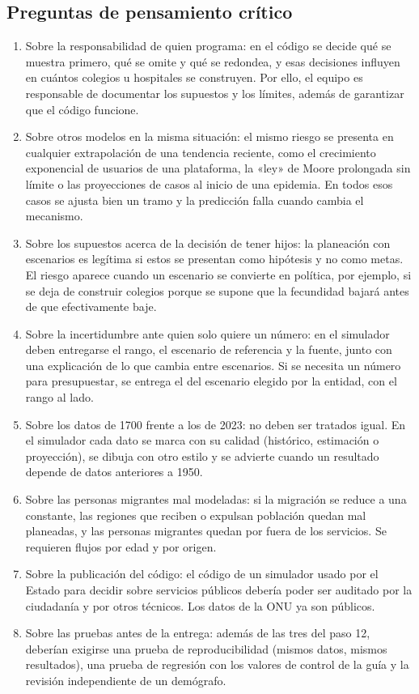 \documentclass[10pt,twocolumn,letterpaper]{article}
\begin{document}
\subsection{Preguntas de pensamiento crítico}
\begin{enumerate}
\item Sobre la responsabilidad de quien programa: en el código se decide qué se muestra primero, qué se omite y qué se redondea, y esas decisiones influyen en cuántos colegios u hospitales se construyen. Por ello, el equipo es responsable de documentar los supuestos y los límites, además de garantizar que el código funcione.
\item Sobre otros modelos en la misma situación: el mismo riesgo se presenta en cualquier extrapolación de una tendencia reciente, como el crecimiento exponencial de usuarios de una plataforma, la «ley» de Moore prolongada sin límite o las proyecciones de casos al inicio de una epidemia. En todos esos casos se ajusta bien un tramo y la predicción falla cuando cambia el mecanismo.
\item Sobre los supuestos acerca de la decisión de tener hijos: la planeación con escenarios es legítima si estos se presentan como hipótesis y no como metas. El riesgo aparece cuando un escenario se convierte en política, por ejemplo, si se deja de construir colegios porque se supone que la fecundidad bajará antes de que efectivamente baje.
\item Sobre la incertidumbre ante quien solo quiere un número: en el simulador deben entregarse el rango, el escenario de referencia y la fuente, junto con una explicación de lo que cambia entre escenarios. Si se necesita un número para presupuestar, se entrega el del escenario elegido por la entidad, con el rango al lado.
\item Sobre los datos de 1700 frente a los de 2023: no deben ser tratados igual. En el simulador cada dato se marca con su calidad (histórico, estimación o proyección), se dibuja con otro estilo y se advierte cuando un resultado depende de datos anteriores a 1950.
\item Sobre las personas migrantes mal modeladas: si la migración se reduce a una constante, las regiones que reciben o expulsan población quedan mal planeadas, y las personas migrantes quedan por fuera de los servicios. Se requieren flujos por edad y por origen.
\item Sobre la publicación del código: el código de un simulador usado por el Estado para decidir sobre servicios públicos debería poder ser auditado por la ciudadanía y por otros técnicos. Los datos de la ONU ya son públicos.
\item Sobre las pruebas antes de la entrega: además de las tres del paso 12, deberían exigirse una prueba de reproducibilidad (mismos datos, mismos resultados), una prueba de regresión con los valores de control de la guía y la revisión independiente de un demógrafo.
\end{enumerate}
\end{document}

